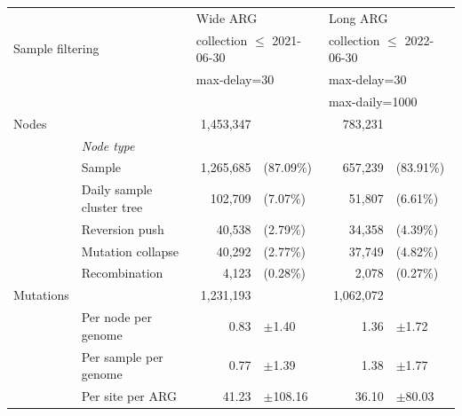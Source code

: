 \documentclass{article}
\begin{document}
\begin{table}
\begin{center}
    \begin{tabular}{llrlrl}\toprule
        &  & \multicolumn{2}{l}{Wide ARG} & \multicolumn{2}{l}{Long ARG} \\
    \cmidrule{3-6}
    \multicolumn{2}{l}{Sample filtering}
             & \multicolumn{2}{l}{collection $\leq$ 2021-06-30}
                 & \multicolumn{2}{l}{collection $\leq$ 2022-06-30} \\
           & & \multicolumn{2}{l}{max-delay=30} & \multicolumn{2}{l}{max-delay=30} \\
        &  & &                               & \multicolumn{2}{l}{max-daily=1000} \\
    \midrule

    Nodes & & 1,453,347 & & 783,231  & \\
     & \emph{Node type} & \\
    & Sample & 1,265,685 & (87.09\%) & 657,239 & (83.91\%) \\
    & Daily sample cluster tree  & 102,709 & (7.07\%) & 51,807 & (6.61\%)  \\
    & Reversion push & 40,538 & (2.79\%) & 34,358 & (4.39\%)  \\
    & Mutation collapse & 40,292 & (2.77\%) & 37,749 & (4.82\%)  \\
    & Recombination & 4,123 & (0.28\%) & 2,078 & (0.27\%) \\
    \cmidrule{2-6}
    Mutations & & 1,231,193 &  & 1,062,072 & \\
    & Per node per genome & 0.83  & $\pm$1.40 & 1.36 & $\pm$1.72 \\
    & Per sample per genome & 0.77  & $\pm$1.39 & 1.38 & $\pm$1.77 \\
    & Per site per ARG & 41.23  & $\pm$108.16    & 36.10 & $\pm$80.03\\

\end{tabular}
\end{center}
\end{table}
\end{document}
